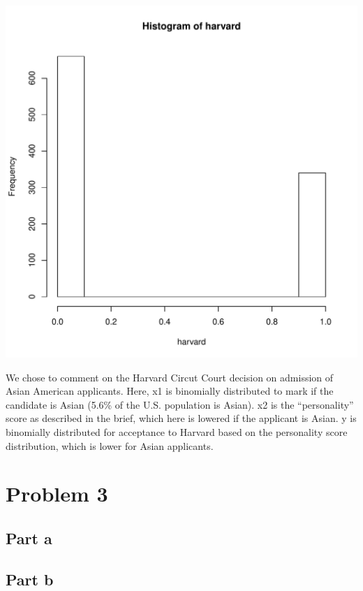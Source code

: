 \documentclass{article}\usepackage[]{graphicx}\usepackage[]{color}
\newenvironment{knitrout}{}{} %
\begin{document}
\begin{knitrout}
\includegraphics[width=5.5in]{figure/p2b-3} 

\end{knitrout}

\noindent We chose to comment on the Harvard Circut Court decision on admission of Asian American applicants.  Here, x1 is binomially distributed to mark if the candidate is Asian (5.6\% of the U.S. population is Asian).  x2 is the ``personality'' score as described in the brief, which here is lowered if the applicant is Asian. y is binomially distributed for acceptance to Harvard based on the personality score distribution, which is lower for Asian applicants.  

\section*{Problem 3}
\subsection*{Part a}
\begin{figure}[h!]
\end{figure}

\subsection*{Part b}
\end{document}
